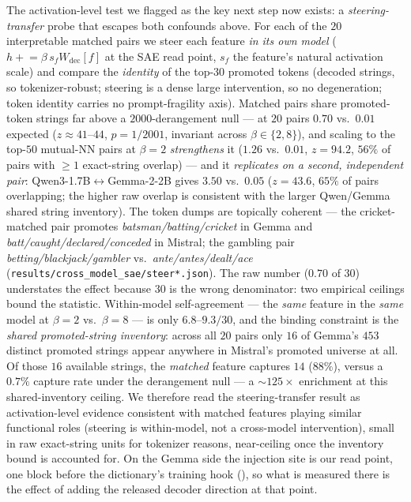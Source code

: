 The activation-level test we flagged as the key next step now exists: a
\emph{steering-transfer} probe that escapes both confounds above. For each of the $20$
interpretable matched pairs we steer each feature \emph{in its own model} ($h \mathrel{+}=
\beta\, s_f W_{\text{dec}}[f]$ at the SAE read point, $s_f$ the feature's natural activation
scale) and compare the \emph{identity} of the top-$30$ promoted tokens (decoded strings, so
tokenizer-robust; steering is a dense large intervention, so no degeneration; token identity
carries no prompt-fragility axis). Matched pairs share promoted-token strings far above a
$2000$-derangement null --- at $20$ pairs $0.70$ vs.\ $0.01$ expected ($z\approx41$--$44$,
$p=1/2001$, invariant across $\beta\in\{2,8\}$), and scaling to the top-$50$ mutual-NN
pairs at $\beta{=}2$ \emph{strengthens} it ($1.26$ vs.\ $0.01$, $z=94.2$, $56\%$ of pairs with $\geq$$1$
exact-string overlap) --- and it \emph{replicates on a second, independent pair}:
Qwen3-1.7B$\leftrightarrow$Gemma-2-2B gives $3.50$ vs.\ $0.05$ ($z=43.6$, $65\%$ of pairs
overlapping; the higher raw overlap is consistent with the larger Qwen/Gemma shared string
inventory). The token dumps are topically coherent --- the
cricket-matched pair promotes \emph{batsman/batting/cricket} in Gemma and
\emph{batt/caught/declared/conceded} in Mistral; the gambling pair
\emph{betting/blackjack/gambler} vs.\ \emph{ante/antes/dealt/ace}
(\texttt{results/cross\_model\_sae/steer*.json}). The raw number ($0.70$ of $30$) understates the effect because $30$ is the wrong
denominator: two empirical ceilings bound the statistic. Within-model self-agreement ---
the \emph{same} feature in the \emph{same} model at $\beta{=}2$ vs.\ $\beta{=}8$ ---
is only $6.8$--$9.3/30$, and the binding constraint is the \emph{shared promoted-string
inventory}: across all $20$ pairs only $16$ of Gemma's $453$ distinct promoted strings appear
anywhere in Mistral's promoted universe at all. Of those $16$ available strings, the
\emph{matched} feature captures $14$ ($88\%$), versus a $0.7\%$ capture rate under the
derangement null --- a ${\sim}125\times$ enrichment at this shared-inventory ceiling. We
therefore read the steering-transfer result as activation-level evidence consistent with
matched features playing similar functional roles (steering is within-model, not a
cross-model intervention), small in raw exact-string units for tokenizer reasons,
near-ceiling once the inventory bound is accounted for. On the Gemma side the injection site is
our read point, one block before the dictionary's training hook (), so what
is measured there is the effect of adding the released decoder direction at that point.





